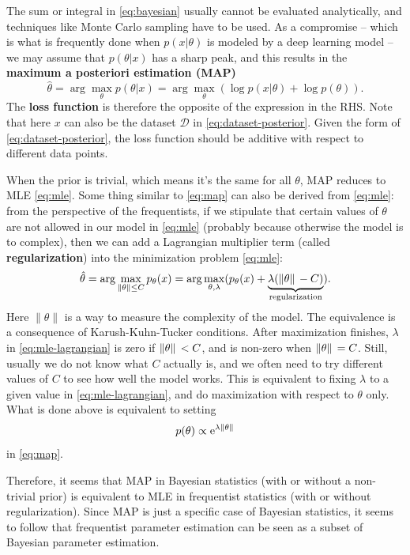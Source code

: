 \documentclass[hyperref, a4paper, 12pt]{report}
\newcommand*{\ee}{\mathrm{e}}
\newcommand*{\argmax}{\arg\max}
\newcommand*{\concept}[1]{{\textbf{#1}}}
\begin{document}
The sum or integral in \eqref{eq:bayesian} usually cannot be evaluated analytically,
and techniques like Monte Carlo sampling have to be used.
As a compromise -- which is what is frequently done when $p(x | \theta)$ is modeled by a deep learning model
-- we may assume that $p(\theta | x)$ has a sharp peak,
and this results in the \concept{maximum a posteriori estimation (MAP)}
\begin{equation}
    \hat{\theta} = \argmax_\theta p(\theta | x) = \argmax_\theta (\log p(x | \theta) + \log p(\theta)).
    \label{eq:map}
\end{equation}
The \concept{loss function} is therefore the opposite of the expression in the RHS.
Note that here $x$ can also be the dataset $\mathcal{D}$ in \eqref{eq:dataset-posterior}.
Given the form of \eqref{eq:dataset-posterior},
the loss function should be additive with respect to different data points.

When the prior is trivial, which means it's the same for all $\theta$,
MAP reduces to MLE \eqref{eq:mle}.
Some thing similar to \eqref{eq:map} can also be derived from \eqref{eq:mle}:
from the perspective of the frequentists,
if we stipulate that certain values of $\theta$ are not allowed in our model in \eqref{eq:mle}
(probably because otherwise the model is to complex),
then we can add a Lagrangian multiplier term (called \concept{regularization}) into the minimization problem \eqref{eq:mle}:
\begin{equation}
    \hat{\theta} = \argmax_{\|\theta\| \leq C} p_\theta(x) = \argmax_{\theta, \lambda} (p_\theta(x) + \underbrace{\lambda (\norm*{\theta} - C)}_{\text{regularization}}).
    \label{eq:mle-lagrangian}
\end{equation}
Here $\|\theta\|$ is a way to measure the complexity of the model.
The equivalence is a consequence of Karush-Kuhn-Tucker conditions.
After maximization finishes, $\lambda$ in \eqref{eq:mle-lagrangian} is zero if $\norm*{\theta} < C$,
and is non-zero when $\norm*{\theta} = C$.
Still, usually we do not know what $C$ actually is,
and we often need to try different values of $C$ to see how well the model works.
This is equivalent to fixing $\lambda$ to a given value in \eqref{eq:mle-lagrangian},
and do maximization with respect to $\theta$ only.
What is done above is equivalent to setting
\begin{equation}
    p(\theta) \propto \ee^{\lambda \norm*{\theta}}
\end{equation}
in \eqref{eq:map}.

Therefore, it seems that MAP in Bayesian statistics (with or without a non-trivial prior)
is equivalent to MLE in frequentist statistics (with or without regularization).
Since MAP is just a specific case of Bayesian statistics,
it seems to follow that frequentist parameter estimation can be seen as a subset of Bayesian parameter estimation.
\end{document}

